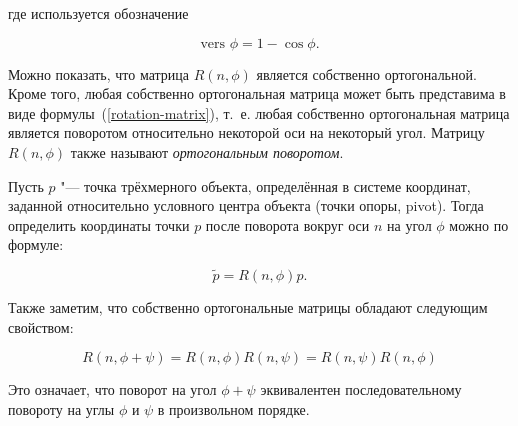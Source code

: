 \noindent где используется обозначение

$$\textrm{vers }\phi=1-\cos \phi.$$

Можно показать, что матрица $R(n,\phi)$ является собственно ортогональной. Кроме того, любая собственно ортогональная
матрица может быть представима в виде формулы~(\ref{rotation-matrix}), т.~е. любая собственно ортогональная матрица
является поворотом относительно некоторой оси на некоторый угол. Матрицу $R(n,\phi)$ также называют
\textit{ортогональным поворотом}.

Пусть $p$ "--- точка трёхмерного объекта, определённая в системе координат, заданной относительно условного центра
объекта (точки опоры, pivot). Тогда определить координаты точки $p$ после поворота вокруг оси $n$ на угол $\phi$
можно по формуле:

$$
\tilde p=R(n,\phi)p.
$$

Также заметим, что собственно ортогональные матрицы обладают следующим свойством:

$$
R(n,\phi+\psi)=R(n,\phi)R(n,\psi)=R(n,\psi)R(n,\phi)
$$

Это означает, что поворот на угол $\phi+\psi$ эквивалентен последовательному повороту на углы $\phi$ и $\psi$ в
произвольном порядке.
